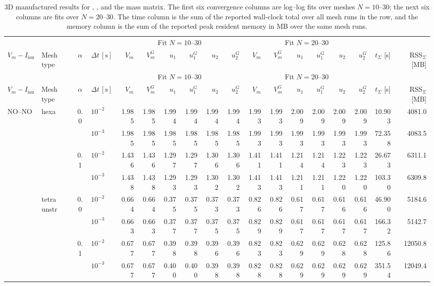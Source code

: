 \tiny
\setlength{\tabcolsep}{1.7pt}
\begin{longtable}{llclrrrrrrrrrrrrrr}
\caption{3D manufactured results for , , and the  mass matrix. The first six convergence columns are log--log fits over meshes $N=10$--$30$; the next six columns are fits over $N=20$--$30$. The time column is the sum of the reported wall-clock total over all mesh runs in the row, and the memory column is the sum of the reported peak resident memory in MB over the same mesh runs.}\label{tab:results-3d-jfnk-cn-cons}\\
\toprule
& & & & \multicolumn{6}{c}{Fit $N=10$--$30$} & \multicolumn{6}{c}{Fit $N=20$--$30$} & & \\
\cmidrule(lr){5-10}\cmidrule(lr){11-16}
$V_m-I_{\mathrm{ion}}$ & Mesh type & $\alpha$ & $\Delta t\,[\text{s}]$ & $V_m$ & $V_m^G$ & $u_1$ & $u_1^G$ & $u_2$ & $u_2^G$ & $V_m$ & $V_m^G$ & $u_1$ & $u_1^G$ & $u_2$ & $u_2^G$ & $t_{\Sigma}$ [s] & RSS$_{\Sigma}$ [MB] \\
\midrule
\endfirsthead
\toprule
& & & & \multicolumn{6}{c}{Fit $N=10$--$30$} & \multicolumn{6}{c}{Fit $N=20$--$30$} & & \\
\cmidrule(lr){5-10}\cmidrule(lr){11-16}
$V_m-I_{\mathrm{ion}}$ & Mesh type & $\alpha$ & $\Delta t\,[\text{s}]$ & $V_m$ & $V_m^G$ & $u_1$ & $u_1^G$ & $u_2$ & $u_2^G$ & $V_m$ & $V_m^G$ & $u_1$ & $u_1^G$ & $u_2$ & $u_2^G$ & $t_{\Sigma}$ [s] & RSS$_{\Sigma}$ [MB] \\
\midrule
\endhead
\multirow{8}{*}{NO--NO} & \multirow{4}{*}{hexa} & \multirow{2}{*}{0.0} & $10^{-2}$ & 1.985 & 1.985 & 1.994 & 1.994 & 1.994 & 1.994 & 1.993 & 1.993 & 2.009 & 2.009 & 2.009 & 2.009 & 10.903 & 4081.0 \\
& & & $10^{-3}$ & 1.985 & 1.985 & 1.985 & 1.985 & 1.985 & 1.985 & 1.993 & 1.993 & 1.993 & 1.993 & 1.993 & 1.993 & 72.358 & 4083.5 \\\cline{3-18}
& & \multirow{2}{*}{0.1} & $10^{-2}$ & 1.436 & 1.436 & 1.297 & 1.297 & 1.306 & 1.306 & 1.411 & 1.411 & 1.214 & 1.214 & 1.223 & 1.223 & 26.673 & 6311.1 \\
& & & $10^{-3}$ & 1.438 & 1.438 & 1.293 & 1.293 & 1.302 & 1.302 & 1.413 & 1.413 & 1.211 & 1.211 & 1.220 & 1.220 & 103.30 & 6309.8 \\\cline{2-18}
& \multirow{4}{*}{tetra unstr} & \multirow{2}{*}{0.0} & $10^{-2}$ & 0.664 & 0.664 & 0.375 & 0.375 & 0.373 & 0.373 & 0.826 & 0.826 & 0.617 & 0.617 & 0.616 & 0.616 & 46.900 & 5184.6 \\
& & & $10^{-3}$ & 0.663 & 0.663 & 0.377 & 0.377 & 0.375 & 0.375 & 0.829 & 0.829 & 0.617 & 0.617 & 0.617 & 0.617 & 166.32 & 5142.7 \\\cline{3-18}
& & \multirow{2}{*}{0.1} & $10^{-2}$ & 0.677 & 0.677 & 0.398 & 0.398 & 0.396 & 0.396 & 0.823 & 0.823 & 0.629 & 0.629 & 0.628 & 0.628 & 125.86 & 12050.8 \\
& & & $10^{-3}$ & 0.677 & 0.677 & 0.400 & 0.400 & 0.398 & 0.398 & 0.828 & 0.828 & 0.629 & 0.629 & 0.629 & 0.629 & 351.54 & 12049.4 \\\hline


\end{longtable}
